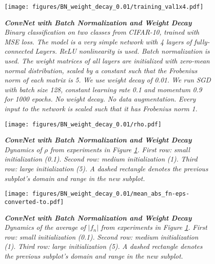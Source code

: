 \documentclass[11pt]{article}
\begin{document}
  

\begin{figure}
  \centering
  \texttt{[image: figures/BN\_weight\_decay\_0.01/training\_val1x4.pdf]}             
  \caption {\it  \textbf{ConvNet with Batch Normalization and Weight Decay} Binary classification on two classes from CIFAR-10, trained with MSE loss. The model is a very simple network with 4 layers of fully-connected Layers. ReLU nonlinearity is used. Batch normalization is used. The weight matrices of all layers are initialized with zero-mean normal distribution, scaled by a constant such that the Frobenius norm of each matrix is 5. We use weight decay of 0.01. We run SGD with batch size 128, constant learning rate 0.1 and momentum 0.9 for 1000 epochs. No weight decay.  No data augmentation.    Every input to the network is scaled such that it has Frobenius norm 1.  }                      
  \label{appendix:fig:conv4_BN_wd_0.01:training_val}
\end{figure}

\begin{figure}
  \centering
  \texttt{[image: figures/BN\_weight\_decay\_0.01/rho.pdf]}
  \caption {\it  \textbf{ConvNet with Batch Normalization and Weight Decay} Dynamics of $\rho$ from experiments in Figure \ref{appendix:fig:conv4_BN_wd_0.01:training_val}. First row: small initialization (0.1).  Second row: medium initialization (1).  Third row:  large initialization (5). A dashed rectangle denotes the previous subplot's domain and range in the new subplot.      }       
  \label{appendix:fig:conv4_BN_wd_0.01:rho}
\end{figure}
%

\begin{figure}
  \centering 
  \texttt{[image: figures/BN\_weight\_decay\_0.01/mean\_abs\_fn-eps-converted-to.pdf]} 
  \caption {\it  \textbf{ConvNet with Batch Normalization and Weight Decay} Dynamics of the average of $|f_n|$ from experiments in Figure \ref{appendix:fig:conv4_BN_wd_0.01:training_val}. First row: small initialization (0.1).  Second row: medium initialization (1).  Third row:  large initialization (5). A dashed rectangle denotes the previous subplot's domain and range in the new subplot.      }              
  \label{appendix:fig:conv4_BN_wd_0.01:mean_abs_fn}
\end{figure}
\end{document}

